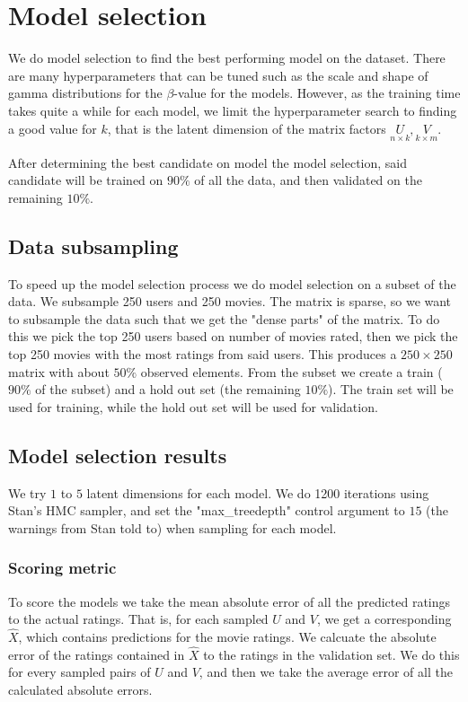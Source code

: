 \documentclass[12pt]{article}
\begin{document}
\section{Model selection}
We do model selection to find the best performing model on the dataset. There are many hyperparameters that can be tuned such as the scale and shape of gamma distributions for the $\beta$-value for the models. However, as the training time takes quite a while for each model, we limit the hyperparameter search to finding a good value for $k$, that is the latent dimension of the matrix factors $\underset{n \times k}{U}, \underset{k \times m}{V}$. 

After determining the best candidate on model the model selection, said candidate will be trained on $90\%$ of all the data, and then validated on the remaining $10\%$.

    \subsection{Data subsampling}
    To speed up the model selection process we do model selection on a subset of the data. We subsample 250 users and 250 movies. The matrix is sparse, so we want to subsample the data such that we get the "dense parts" of the matrix. To do this we pick the top 250 users based on number of movies rated, then we pick the top 250 movies with the most ratings from said users. This produces a $250 \times 250$ matrix with about $50\%$ observed elements. From the subset we create a train ($90\%$ of the subset) and a hold out set (the remaining $10\%$). The train set will be used for training, while the hold out set will be used for validation.

    \subsection{Model selection results}
    We try $1$ to $5$ latent dimensions for each model. We do 1200 iterations using Stan's HMC sampler, and set the "max\_treedepth" control argument to $15$ (the warnings from Stan told to) when sampling for each model.

        \subsubsection*{Scoring metric}
        To score the models we take the mean absolute error of all the predicted ratings to the actual ratings. That is, for each sampled $U$ and $V$, we get a corresponding $\hat{X}$, which contains predictions for the movie ratings. We calcuate the absolute error of the ratings contained in $\hat{X}$ to the ratings in the validation set. We do this for every sampled pairs of $U$ and $V$, and then we take the average error of all the calculated absolute errors. 
        
\end{document}
